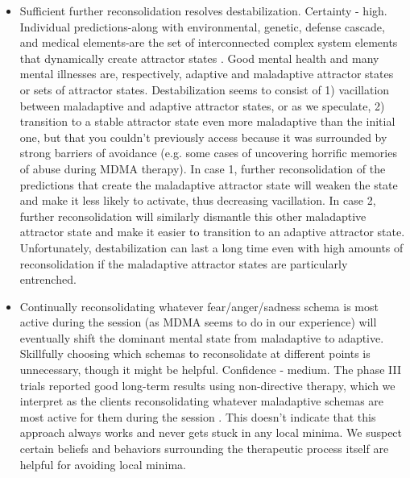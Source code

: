 \documentclass[12pt,letterpaper]{book}
\begin{document}
\begin{itemize}
	\item Sufficient further reconsolidation resolves destabilization. Certainty - high. Individual predictions-along with environmental, genetic, defense cascade, and medical elements-are the set of interconnected complex system elements that dynamically create attractor states \cite{hayes2020complex,friston2010free}. Good mental health and many mental illnesses are, respectively, adaptive and maladaptive attractor states or sets of attractor states. Destabilization seems to consist of 1) vacillation between maladaptive and adaptive attractor states, or as we speculate, 2) transition to a stable attractor state even more maladaptive than the initial one, but that you couldn't previously access because it was surrounded by strong barriers of avoidance (e.g. some cases of uncovering horrific memories of abuse during MDMA therapy). In case 1, further reconsolidation of the predictions that create the maladaptive attractor state will weaken the state and make it less likely to activate, thus decreasing vacillation. In case 2, further reconsolidation will similarly dismantle this other maladaptive attractor state and make it easier to transition to an adaptive attractor state. Unfortunately, destabilization can last a long time even with high amounts of reconsolidation if the maladaptive attractor states are particularly entrenched.
	\item Continually reconsolidating whatever fear/anger/sadness schema is most active during the session (as MDMA seems to do in our experience) will eventually shift the dominant mental state from maladaptive to adaptive. Skillfully choosing which schemas to reconsolidate at different points is unnecessary, though it might be helpful. Confidence - medium. The phase III trials reported good long-term results using non-directive therapy, which we interpret as the clients reconsolidating whatever maladaptive schemas are most active for them during the session \cite{mitchellMDMAClinicalTrial2,mitchellMDMAClinicalTrial,mithoeferManual}. This doesn't indicate that this approach always works and never gets stuck in any local minima. We suspect certain beliefs and behaviors surrounding the therapeutic process itself are helpful for avoiding local minima.
\end{itemize}
\end{document}
